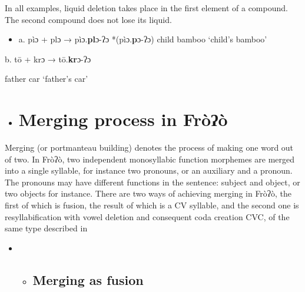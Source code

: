 In all examples, liquid deletion takes place in the first element of a compound. The second compound does not lose its liquid.

\begin{itemize}
\item \begin{styleindexi}
  a. pìɔ          +          plɔ                           →            pìɔ.\textbf{pl}ɔ{}-ʔɔ       *(pìɔ.\textbf{p}ɔ{}-ʔɔ)            child                   bamboo                                   ‘child’s bamboo’  
\end{styleindexi}\end{itemize}
\begin{styleindexi}
          b. tō            +          krɔ                           →            tō.\textbf{kr}ɔ{}-ʔɔ                      
\end{styleindexi}

\begin{styleindexi}
             father                car                                         ‘father’s car’
\end{styleindexi}

\begin{itemize}
\item \section{ Merging process in Fròʔò} \end{itemize}

Merging (or portmanteau building) denotes the process of making one word out of two. In Fròʔò, two independent monosyllabic function morphemes are merged into a single syllable, for instance two pronouns, or an auxiliary and a pronoun. The pronouns may have different functions in the sentence: subject and object, or two objects for instance. There are two ways of achieving merging in Fròʔò, the first of which is fusion, the result of which is a CV syllable, and the second one is resyllabification with vowel deletion and consequent coda creation CVC, of the same type described in  

\begin{itemize}
\item \begin{itemize}
\item \subsection{ Merging as fusion}\end{itemize}
\end{itemize}

